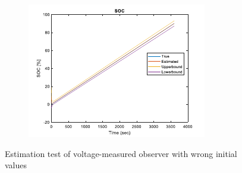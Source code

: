 \documentclass[12pt]{article}
\begin{document}
\begin{figure}[H]
\begin{subfigure}[t]{0.3\linewidth}
		\includegraphics[width=\linewidth]{figures/estVoltIni5.pdf}
	\end{subfigure}	
	\caption{Estimation test of voltage-measured observer with wrong initial values}\label{fig:estVoltIni}
\end{figure}
\end{document}
